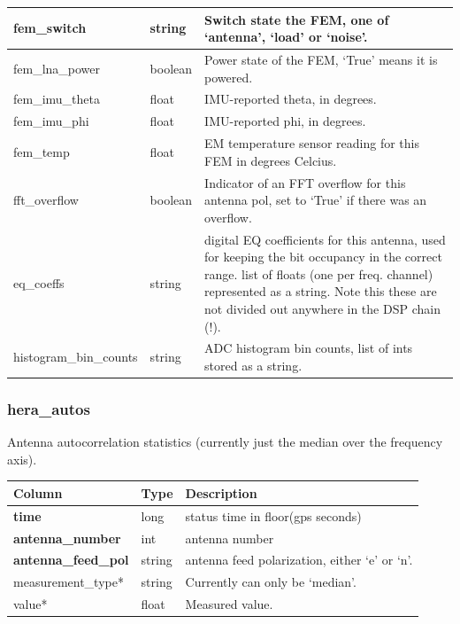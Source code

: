 \documentclass{article}
\begin{document}
{\begin{center}
\begin{tabular}{| p{4cm} | p{2cm} | p{10cm} |}
fem\_switch & string & Switch state the FEM, one of `antenna', `load' or `noise'. \\ \hline
fem\_lna\_power & boolean & Power state of the FEM, `True' means it is powered. \\ \hline
fem\_imu\_theta & float & IMU-reported theta, in degrees. \\ \hline
fem\_imu\_phi & float & IMU-reported phi, in degrees. \\ \hline
fem\_temp & float & EM temperature sensor reading for this FEM in degrees Celcius. \\ \hline
fft\_overflow & boolean & Indicator of an FFT overflow for this antenna pol, set to `True' if there was an overflow. \\ \hline
eq\_coeffs & string & digital EQ coefficients for this antenna, used for keeping the bit occupancy in the
            correct range. list of floats (one per freq. channel) represented as a string. Note this these are
            not divided out anywhere in the DSP chain (!). \\\hline
histogram\_bin\_counts & string & ADC histogram bin counts, list of ints stored as a string. \\ \hline
\end{tabular}
\end{center}

\subsubsection{hera\_autos}
Antenna autocorrelation statistics (currently just the median over the frequency axis).
\begin{center}
\begin{tabular}{| p{4cm} | p{2cm} | p{10cm} |}
\hline
 {\bf Column} & {\bf Type}  & {\bf Description} \\ [0.5ex]  \hline\hline
\textbf{time} & long & status time in floor(gps seconds)\\ \hline
\textbf{antenna\_number} & int & antenna number \\ \hline
\textbf{antenna\_feed\_pol} & string & antenna feed polarization, either `e' or `n'. \\ \hline
measurement\_type* & string & Currently can only be `median'. \\ \hline
value* & float & Measured value. \\ \hline
\end{tabular}
\end{center}


}
\end{document}
